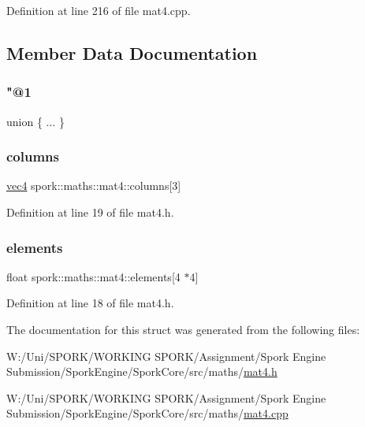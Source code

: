 Definition at line 216 of file mat4.\+cpp.



\subsection{Member Data Documentation}
\mbox{\label{structspork_1_1maths_1_1mat4_aeeec09efc7af1895ba8833e179c15e53}} 
\subsubsection{\texorpdfstring{"@1}{@1}}
{\footnotesize\ttfamily union \{ ... \} }

\mbox{\label{structspork_1_1maths_1_1mat4_abf628a07e5dbd841155b941a1c157acf}} 
\subsubsection{\texorpdfstring{columns}{columns}}
{\footnotesize\ttfamily \hyperlink{structspork_1_1maths_1_1vec4}{vec4} spork\+::maths\+::mat4\+::columns\mbox{[}3\mbox{]}}



Definition at line 19 of file mat4.\+h.

\mbox{\label{structspork_1_1maths_1_1mat4_a0a8a151f19ba28db2930db1931d304ae}} 
\subsubsection{\texorpdfstring{elements}{elements}}
{\footnotesize\ttfamily float spork\+::maths\+::mat4\+::elements\mbox{[}4 $\ast$4\mbox{]}}



Definition at line 18 of file mat4.\+h.



The documentation for this struct was generated from the following files\+:\begin{DoxyCompactItemize}
\item 
W\+:/\+Uni/\+S\+P\+O\+R\+K/\+W\+O\+R\+K\+I\+N\+G S\+P\+O\+R\+K/\+Assignment/\+Spork Engine Submission/\+Spork\+Engine/\+Spork\+Core/src/maths/\hyperlink{mat4_8h}{mat4.\+h}\item 
W\+:/\+Uni/\+S\+P\+O\+R\+K/\+W\+O\+R\+K\+I\+N\+G S\+P\+O\+R\+K/\+Assignment/\+Spork Engine Submission/\+Spork\+Engine/\+Spork\+Core/src/maths/\hyperlink{mat4_8cpp}{mat4.\+cpp}\end{DoxyCompactItemize}
